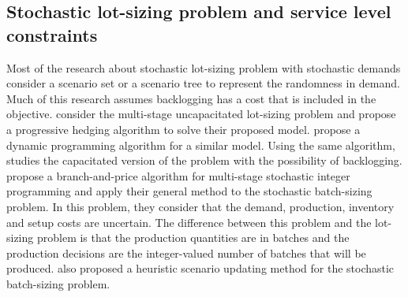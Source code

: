 \documentclass[msom]{oo}
\begin{document}
\subsection{Stochastic lot-sizing problem and service level constraints}
Most of the research about stochastic lot-sizing problem with stochastic demands consider a scenario set or a scenario tree to represent the randomness in demand. Much of this research assumes backlogging has a cost that is included in the objective. \cite{haugen2001progressive} consider the multi-stage uncapacitated lot-sizing problem and propose a progressive hedging algorithm to solve their proposed model. \cite{guan2008polynomial} propose a dynamic programming algorithm for a similar model. Using the same algorithm, \cite{guan2011stochastic} studies the capacitated version of the problem with the possibility of backlogging. \cite{lulli2004branch} propose a branch-and-price algorithm for multi-stage stochastic integer programming and apply their general method to the stochastic batch-sizing problem. In this problem, they consider that the demand, production, inventory and setup costs are uncertain. The difference between this problem and the lot-sizing problem is that the production quantities are in batches and the production decisions are the integer-valued number of batches that will be produced. %
\cite{lulli2006heuristic} also proposed a heuristic scenario updating method for the stochastic batch-sizing problem.
\end{document}
